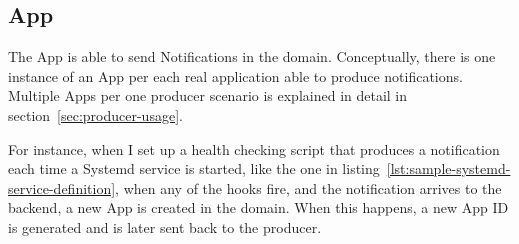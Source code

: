 \subsection{App}\label{sec:app}

The App is able to send Notifications
in the domain.
Conceptually,
there is one instance of an App
per each real application
able to produce notifications.
Multiple Apps per one producer scenario
is explained in detail in section~\ref{sec:producer-usage}.

For instance,
when I set up a health checking script
that produces a notification each time
a Systemd service is started,
like the one in listing~\ref{lst:sample-systemd-service-definition},
when any of the hooks fire,
and the notification arrives to the backend,
a new App is created in the domain.
When this happens,
a new App ID is generated
and is later sent back to the producer.

